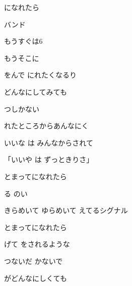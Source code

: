 \documentclass[a4paper,tate,twocolumn,12pt]{ltjtarticle}
\begin{document}
\thispagestyle{empty}

\begin{center}
{\LARGE {}になれたら}

{\large {}バンド}
\end{center}

\vspace{1em}

\begin{flushleft}

\noindent\begin{minipage}{\linewidth}
もうすぐは6

もうそこに

をんで にれたくなるり

どんなにしてみても

つしかない

 れたところからあんなにく
\end{minipage}

\vspace{2em}

\noindent\begin{minipage}{\linewidth}
いいな は みんなからされて

「いいや は ずっときりさ」
\end{minipage}

\vspace{2em}

\noindent\begin{minipage}{\linewidth}
とまってになれたら

る のい

きらめいて ゆらめいて えてるシグナル

とまってになれたら

げて をされるような

つないだ かないで

がどんなにしくても
\end{minipage}


\end{flushleft}
\end{document}

